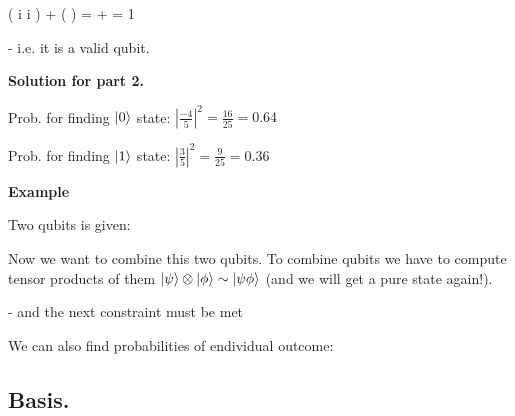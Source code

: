 \documentclass{article}
\begin{document}
\beqn
\left( i \cdot {}i \right) + \left(  \cdot {} \right) = 
 +  = 1
\eeq

- i.e. it is a valid qubit.

\textbf{Solution for part 2.}

Prob. for finding $\ket{0}$ state: $\left| \frac{-4}{5} \right|^{2} = \frac{16}{25} = 0.64$

Prob. for finding $\ket{1}$ state: $\left| \frac{3}{5} \right|^{2} = \frac{9}{25} = 0.36$

\textbf{Example}


Two qubits is given:



Now we want to combine this two qubits. To combine qubits we have to compute tensor products of them
$\ket{\psi} \otimes \ket{\phi} \sim \ket{\psi \phi}$
(and we will get a pure state again!).


- and the next constraint must be met


We can also find probabilities of endividual outcome:



\subsection{Basis.}

\end{document}
